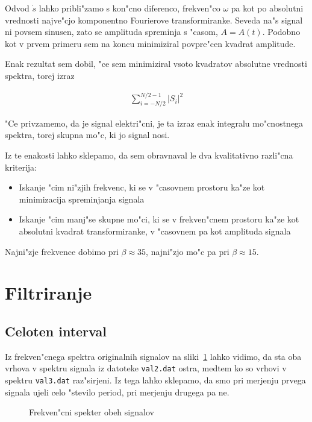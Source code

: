 \documentclass[a4paper,10pt]{article}
\begin{document}
Odvod $\dot s$ lahko pribli"zamo s kon"cno diferenco, frekven"co $\omega$ pa kot po absolutni vrednosti najve"cjo komponentno Fourierove transformiranke. Seveda na"s signal ni povsem sinusen, zato se amplituda spreminja s "casom, $A = A(t)$. Podobno kot v prvem primeru sem na koncu minimiziral povpre"cen kvadrat amplitude. 

Enak rezultat sem dobil, "ce sem minimiziral vsoto kvadratov absolutne vrednosti spektra, torej izraz

\begin{align}
 \sum_{i=-N/2}^{N/2-1} |S_i|^2
\end{align}

"Ce privzamemo, da je signal elektri"cni, je ta izraz enak integralu mo"cnostnega spektra, torej skupna mo"c, ki jo signal nosi. 

Iz te enakosti lahko sklepamo, da sem obravnaval le dva kvalitativno razli"cna kriterija:
\begin{itemize}
 \item Iskanje "cim ni"zjih frekvenc, ki se v "casovnem prostoru ka"ze kot minimizacija spreminjanja signala
 \item Iskanje "cim manj"se skupne mo"ci, ki se v frekven"cnem prostoru ka"ze kot absolutni kvadrat transformiranke, v "casovnem pa kot amplituda signala
\end{itemize}

Najni"zje frekvence dobimo pri $\beta \approx 35$, najni"zjo mo"c pa pri $\beta \approx 15$. 


\newpage
\section{Filtriranje}

\subsection{Celoten interval}

Iz frekven"cnega spektra originalnih signalov na sliki~\ref{fig:val-fft} lahko vidimo, da sta oba vrhova v spektru signala iz datoteke \texttt{val2.dat} ostra, medtem ko so vrhovi v spektru \texttt{val3.dat} raz"sirjeni. Iz tega lahko sklepamo, da smo pri merjenju prvega signala ujeli celo "stevilo period, pri merjenju drugega pa ne. 

\begin{figure}[h]
 
\caption{Frekven"cni spekter obeh signalov}
\label{fig:val-fft}
\end{figure}
\end{document}

